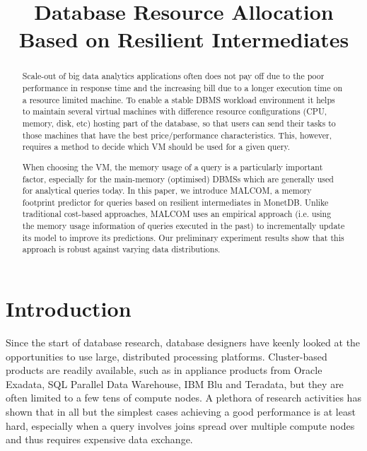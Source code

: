 \documentclass[conference]{IEEEtran}
\begin{document}
\title{Database Resource Allocation Based on Resilient Intermediates}

\author{
}

\maketitle

\begin{abstract} 
Scale-out of big data analytics applications often does not pay off due to the poor performance in response time  and the increasing bill due to a longer execution time on a resource limited machine.
To enable a stable DBMS workload environment it helps to maintain several virtual machines with difference resource configurations (CPU, memory, disk, etc) hosting part of the database, so that users can send their tasks to those machines that have the best price/performance characteristics.
This, however, requires a method to decide which VM should be used for a given query.

When choosing the VM, the memory usage of a query is a particularly important factor, especially for the main-memory (optimised) DBMSs which are generally used for analytical queries today.
In this paper, we introduce MALCOM, a memory footprint predictor for queries based on resilient intermediates in MonetDB.
Unlike traditional cost-based approaches, MALCOM uses an empirical approach (i.e. using the memory usage information of queries executed in the past) to incrementally update its model to improve its predictions.
Our preliminary experiment results show that this approach is robust against varying data distributions.
\end{abstract} 

\section{Introduction}
\label{Introduction} 
Since the start of database research, database designers have keenly looked at the opportunities to use large, distributed processing platforms. Cluster-based products are readily available, such as in appliance products from Oracle Exadata, SQL Parallel Data Warehouse, IBM Blu and Teradata, but they are often limited to a few tens of compute nodes.
A plethora of research activities has shown that in all but the simplest cases achieving a good performance is at least hard, especially when a query involves joins spread over multiple compute nodes and thus requires expensive data exchange.
\end{document}
